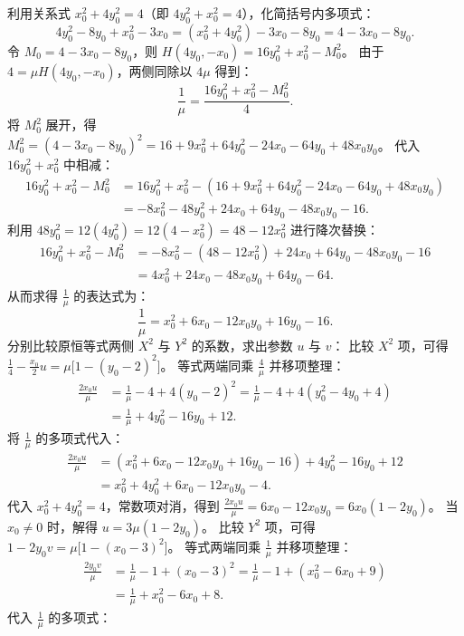 \begin{solution}
利用关系式 $x_0^2 + 4y_0^2 = 4$（即 $4y_0^2 + x_0^2 = 4$），化简括号内多项式：
\[ 4y_0^2 - 8y_0 + x_0^2 - 3x_0 = (x_0^2 + 4y_0^2) - 3x_0 - 8y_0 = 4 - 3x_0 - 8y_0. \]
令 $M_0 = 4 - 3x_0 - 8y_0$，则 $H(4y_0, -x_0) = 16y_0^2 + x_0^2 - M_0^2$。
由于 $4 = \mu H(4y_0, -x_0)$，两侧同除以 $4\mu$ 得到：
\[ \frac{1}{\mu} = \frac{16y_0^2 + x_0^2 - M_0^2}{4}. \]
将 $M_0^2$ 展开，得 $M_0^2 = (4 - 3x_0 - 8y_0)^2 = 16 + 9x_0^2 + 64y_0^2 - 24x_0 - 64y_0 + 48x_0 y_0$。
代入 $16y_0^2 + x_0^2$ 中相减：
\begin{align*}
16y_0^2 + x_0^2 - M_0^2 &= 16y_0^2 + x_0^2 - (16 + 9x_0^2 + 64y_0^2 - 24x_0 - 64y_0 + 48x_0 y_0) \\
&= -8x_0^2 - 48y_0^2 + 24x_0 + 64y_0 - 48x_0 y_0 - 16.
\end{align*}
利用 $48y_0^2 = 12(4y_0^2) = 12(4 - x_0^2) = 48 - 12x_0^2$ 进行降次替换：
\begin{align*}
16y_0^2 + x_0^2 - M_0^2 &= -8x_0^2 - (48 - 12x_0^2) + 24x_0 + 64y_0 - 48x_0 y_0 - 16 \\
&= 4x_0^2 + 24x_0 - 48x_0 y_0 + 64y_0 - 64.
\end{align*}
从而求得 $\frac{1}{\mu}$ 的表达式为：
\[ \frac{1}{\mu} = x_0^2 + 6x_0 - 12x_0 y_0 + 16y_0 - 16. \]
分别比较原恒等式两侧 $X^2$ 与 $Y^2$ 的系数，求出参数 $u$ 与 $v$：
比较 $X^2$ 项，可得 $\frac{1}{4} - \frac{x_0}{2} u = \mu \big[ 1 - (y_0 - 2)^2 \big]$。
等式两端同乘 $\frac{4}{\mu}$ 并移项整理：
\begin{align*}
\frac{2x_0 u}{\mu} &= \frac{1}{\mu} - 4 + 4(y_0 - 2)^2 = \frac{1}{\mu} - 4 + 4(y_0^2 - 4y_0 + 4) \\
&= \frac{1}{\mu} + 4y_0^2 - 16y_0 + 12.
\end{align*}
将 $\frac{1}{\mu}$ 的多项式代入：
\begin{align*}
\frac{2x_0 u}{\mu} &= (x_0^2 + 6x_0 - 12x_0 y_0 + 16y_0 - 16) + 4y_0^2 - 16y_0 + 12 \\
&= x_0^2 + 4y_0^2 + 6x_0 - 12x_0 y_0 - 4.
\end{align*}
代入 $x_0^2 + 4y_0^2 = 4$，常数项对消，得到 $\frac{2x_0 u}{\mu} = 6x_0 - 12x_0 y_0 = 6x_0(1 - 2y_0)$。
当 $x_0 \neq 0$ 时，解得 $u = 3\mu(1 - 2y_0)$。
比较 $Y^2$ 项，可得 $1 - 2y_0 v = \mu \big[ 1 - (x_0 - 3)^2 \big]$。
等式两端同乘 $\frac{1}{\mu}$ 并移项整理：
\begin{align*}
\frac{2y_0 v}{\mu} &= \frac{1}{\mu} - 1 + (x_0 - 3)^2 = \frac{1}{\mu} - 1 + (x_0^2 - 6x_0 + 9) \\
&= \frac{1}{\mu} + x_0^2 - 6x_0 + 8.
\end{align*}
代入 $\frac{1}{\mu}$ 的多项式：

\end{solution}
